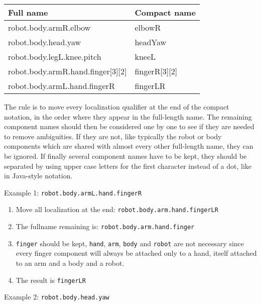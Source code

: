 \documentclass[a4paper]{article}
\newcommand\liststyleLi{%
\renewcommand\theenumi{\arabic{enumi}}
\renewcommand\theenumii{\arabic{enumii}}
\renewcommand\theenumiii{\arabic{enumiii}}
\renewcommand\theenumiv{\arabic{enumiv}}
\renewcommand\labelenumi{\theenumi.}
\renewcommand\labelenumii{\theenumii.}
\renewcommand\labelenumiii{\theenumiii.}
\renewcommand\labelenumiv{\theenumiv.}
}
\begin{document}
\begin{flushleft}
\tablehead{}
\begin{supertabular}{|m{9.008cm}|m{5.533cm}|}
\hline
{}\sffamily Full name &
\sffamily Compact name\\\hline
{}\ttfamily robot.body.armR.elbow &
\ttfamily elbowR\\\hline
{}\ttfamily robot.body.head.yaw &
\ttfamily headYaw\\\hline
{}\ttfamily robot.body.legL.knee.pitch &
\ttfamily kneeL\\\hline
{}\ttfamily robot.body.armR.hand.finger[3][2] &
\ttfamily fingerR[3][2]\\\hline
{}\ttfamily robot.body.armL.hand.fingerR &
\ttfamily fingerLR\\\hline
\end{supertabular}
\end{flushleft}
{\sffamily
The rule is to move every localization qualifier at the end of the
compact notation, in the order where they appear in the full-length
name. The remaining component names should then be considered one by
one to see if they are needed to remove ambiguities. If they are not,
like typically the robot or body components which are shared with
almost every other full-length name, they can be ignored. If finally
several component names have to be kept, they should be separated by
using upper case letters for the first character instead of a dot, like
in Java-style notation.}

{\sffamily
Example 1: \texttt{robot.body.armL.hand.fingerR}}

\liststyleLi
\begin{enumerate}
\item {\sffamily
Move all localization at the end: \texttt{robot.body.arm.hand.fingerLR}}
\item {\sffamily
The fullname remaining is: \texttt{robot.body.arm.hand.finger}}
\item {\sffamily
\texttt{finger} should be kept, \texttt{hand}, \texttt{arm},
\texttt{body} and \texttt{robot} are not necessary since every finger
component will always be attached only to a hand, itself attached to an
arm and a body and a robot.}
\item {\sffamily
The result is \texttt{fingerLR}}
\end{enumerate}
{\sffamily
Example 2: \texttt{robot.body.head.yaw}}
\end{document}
